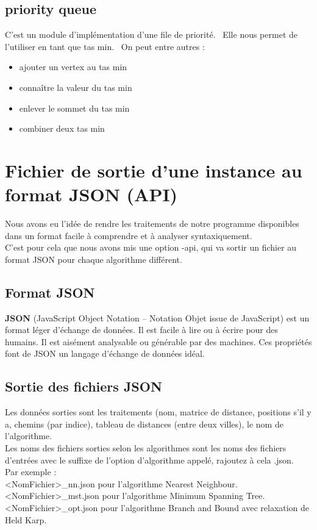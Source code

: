 \documentclass[12pt]{report}
\begin{document}
{{{{{{{\subsection{priority queue}

C'est un module d'implémentation d'une file de priorité. \
Elle nous permet de l'utiliser en tant que tas min. \
On peut entre autres : 
\begin{itemize}
\item ajouter un vertex au tas min
\item connaître la valeur du tas min
\item enlever le sommet du tas min
\item combiner deux tas min
\end{itemize}

\section{Fichier de sortie d'une instance au format JSON (API)}

Nous avons eu l'idée de rendre les traitements de notre programme disponibles dans un format facile à comprendre et à analyser syntaxiquement.\\
C'est pour cela que nous avons mis une option -api, qui va sortir un fichier au format JSON pour chaque algorithme différent.

\subsection{Format JSON}

\textbf{JSON} (JavaScript Object Notation – Notation Objet issue de JavaScript) est un format léger d'échange de données. Il est facile à lire ou à écrire pour des humains. Il est aisément analysable ou générable par des machines. Ces propriétés font de JSON un langage d'échange de données idéal.

\subsection{Sortie des fichiers JSON}

Les données sorties sont les traitements (nom, matrice de distance, positions s'il y a, chemins (par indice), tableau de distances (entre deux villes), le nom de l'algorithme.\\
Les noms des fichiers sorties selon les algorithmes sont les noms des fichiers d'entrées avec le suffixe de l'option d'algorithme appelé, rajoutez à cela .json. \\
Par exemple : \\
<NomFichier>\_nn.json  pour l'algorithme Nearest Neighbour.\\
<NomFichier>\_mst.json  pour l'algorithme Minimum Spanning Tree.\\
<NomFichier>\_opt.json  pour l'algorithme Branch and Bound avec relaxation de Held Karp.


}}}}}}}
\end{document}
